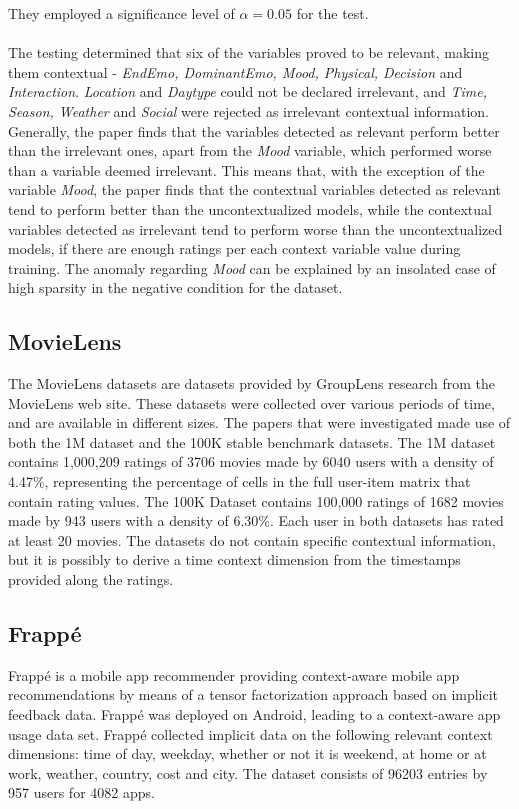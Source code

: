 They employed a significance level of $\alpha = 0.05$ for the test.
\\\\
The testing determined that six of the variables proved to be relevant, making them contextual - \textit{EndEmo, DominantEmo, Mood, Physical, Decision} and \textit{Interaction}.
\textit{Location} and \textit{Daytype} could not be declared irrelevant, and \textit{Time, Season, Weather} and \textit{Social} were rejected as irrelevant contextual information.
Generally, the paper finds that the variables detected as relevant perform better than the irrelevant ones, apart from the \textit{Mood} variable, which performed worse than a variable deemed irrelevant.
This means that, with the exception of the variable \textit{Mood}, the paper finds that the contextual variables detected as relevant tend to perform better than the uncontextualized models, while the contextual variables detected as irrelevant tend to perform worse than the uncontextualized models, if there are enough ratings per each context variable value during training.
The anomaly regarding \textit{Mood} can be explained by an insolated case of high sparsity in the negative condition for the dataset.

\subsection{MovieLens}
The MovieLens datasets are datasets provided by GroupLens research from the MovieLens web site.
These datasets were collected over various periods of time, and are available in different sizes\cite{movielens}.
The papers that were investigated made use of both the 1M dataset and the 100K stable benchmark datasets.
The 1M dataset contains 1,000,209 ratings of 3706 movies made by 6040 users with a density of 4.47\%, representing the percentage of cells in the full user-item matrix that contain rating values\cite{MovieLens2015}.
The 100K Dataset contains 100,000 ratings of 1682 movies made by 943 users with a density of 6.30\%\cite{MovieLens2015}.
Each user in both datasets has rated at least 20 movies.
The datasets do not contain specific contextual information, but it is possibly to derive a time context dimension from the timestamps provided along the ratings.

\subsection{Frappé}
Frappé is a mobile app recommender providing context-aware mobile app recommendations by means of a tensor factorization approach based on implicit feedback data\cite{baltrunas2015frappe}.
Frappé was deployed on Android, leading to a context-aware app usage data set.
Frappé collected implicit data on the following relevant context dimensions: time of day, weekday, whether or not it is weekend, at home or at work, weather, country, cost and city. 
The dataset consists of 96203 entries by 957 users for 4082 apps.

